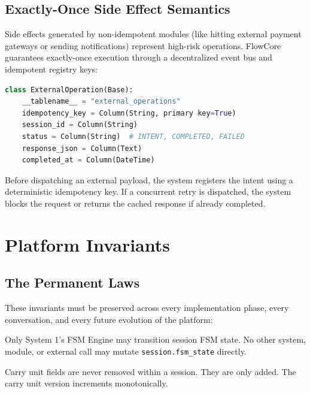 \documentclass[12pt, a4paper]{report}
\newenvironment{invariantbox}[1]{%
  \begin{tcolorbox}[
    colback=red!4!white,
    colframe=warningred,
    title={\textbf{INVARIANT: #1}},
    fonttitle=\small\bfseries
  ]
}{%
  \end{tcolorbox}
}
\begin{document}
\section{Exactly-Once Side Effect Semantics}

Side effects generated by non-idempotent modules (like hitting external payment gateways or sending notifications) represent high-risk operations. FlowCore guarantees exactly-once execution through a decentralized event bus and idempotent registry keys:

\begin{lstlisting}[language=Python]
class ExternalOperation(Base):
    __tablename__ = "external_operations"
    idempotency_key = Column(String, primary key=True)
    session_id = Column(String)
    status = Column(String)  # INTENT, COMPLETED, FAILED
    response_json = Column(Text)
    completed_at = Column(DateTime)
\end{lstlisting}

Before dispatching an external payload, the system registers the intent using a deterministic idempotency key. If a concurrent retry is dispatched, the system blocks the request or returns the cached response if already completed.

\chapter{Platform Invariants}

\section{The Permanent Laws}

These invariants must be preserved across every implementation phase, every conversation, and every future evolution of the platform:

\begin{invariantbox}{INV-01: FSM Authority}
Only System 1's FSM Engine may transition session FSM state. No other system, module, or external call may mutate \texttt{session.fsm\_state} directly.
\end{invariantbox}

\begin{invariantbox}{INV-02: Carry Unit Append-Only}
Carry unit fields are never removed within a session. They are only added. The carry unit version increments monotonically.
\end{invariantbox}
\end{document}
